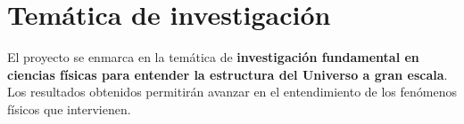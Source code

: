 
\section{Tem\'atica de investigaci\'on}

El proyecto se enmarca en la tem\'atica de {\bf investigaci\'on
  fundamental en ciencias f\'isicas para entender la estructura del
  Universo a gran escala}. Los resultados obtenidos
permitir\'an avanzar en el entendimiento de los fen\'omenos f\'isicos
que intervienen. 


